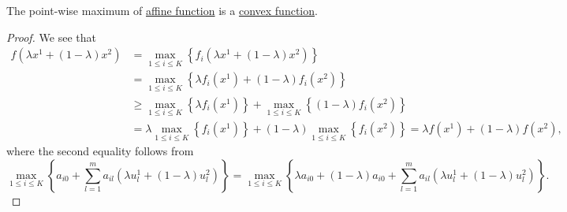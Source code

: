 \begin{theorem}
	The point-wise maximum of \hyperref[def:affine-function]{affine function} is a \hyperref[def:convex-function]{convex function}.
\end{theorem}
\begin{proof}
	We see that
	\[
		\begin{split}
			f(\lambda x^1 + (1 - \lambda)x^2) & =\max_{1\leq i\leq K}\left\{ f_i(\lambda x^1 + (1 - \lambda)x^2) \right\}                                                 \\
			                                  & =\max_{1\leq i\leq K}\left\{ \lambda f_{i}(x^1) + (1 - \lambda)f_{i}(x^2) \right\}                                        \\
			                                  & \geq \max_{1\leq i\leq K}\left\{ \lambda f_{i}(x^1)\right\} + \max_{1\leq i\leq K}\left\{(1 - \lambda)f_{i}(x^2) \right\} \\
			                                  & =\lambda\max_{1\leq i\leq K}\left\{f_{i}(x^1)\right\} + (1 - \lambda)\max_{1\leq i\leq K}\left\{f_{i}(x^2) \right\}
			= \lambda f(x^1)+(1 - \lambda)f(x^2),
		\end{split}
	\]
	where the second equality follows from
	\[
		\max_{1\leq i\leq K}\left\{ a_{i0}+\sum\limits_{l=1}^{m} a_{il}(\lambda u^1_l + (1 - \lambda)u^2_l) \right\}
		= \max_{1\leq i\leq K}\left\{ \lambda a_{i0}+(1 - \lambda)a_{i0} + \sum\limits_{l=1}^{m} a_{il}(\lambda u^1_l + (1 - \lambda)u^2_l) \right\}.
	\]
\end{proof}